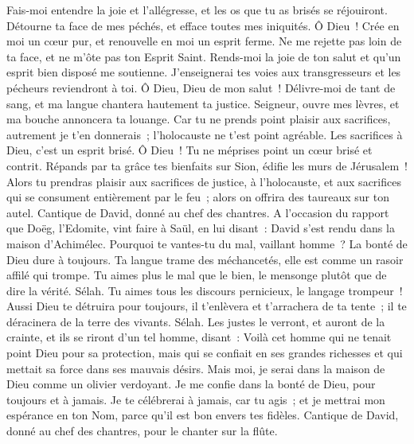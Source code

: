 \begin{multicols}{2}
Fais-moi entendre la joie et l'allégresse, et les os que tu as brisés se réjouiront.
Détourne ta face de mes péchés, et efface toutes mes iniquités.
Ô Dieu~! Crée en moi un cœur pur, et renouvelle en moi un esprit ferme.
Ne me rejette pas loin de ta face, et ne m'ôte pas ton Esprit Saint.
Rends-moi la joie de ton salut et qu'un esprit bien disposé me soutienne.
J'enseignerai tes voies aux transgresseurs et les pécheurs reviendront à toi.
Ô Dieu, Dieu de mon salut~! Délivre-moi de tant de sang, et ma langue chantera hautement ta justice.
Seigneur, ouvre mes lèvres, et ma bouche annoncera ta louange.
Car tu ne prends point plaisir aux sacrifices, autrement je t'en donnerais~; l'holocauste ne t'est point agréable.
Les sacrifices à Dieu, c'est un esprit brisé. Ô Dieu~! Tu ne méprises point un cœur brisé et contrit.
Répands par ta grâce tes bienfaits sur Sion, édifie les murs de Jérusalem~!
Alors tu prendras plaisir aux sacrifices de justice, à l'holocauste, et aux sacrifices qui se consument entièrement par le feu~; alors on offrira des taureaux sur ton autel.
\VerseOne{}Cantique de David, donné au chef des chantres.
A l'occasion du rapport que Doëg, l'Edomite, vint faire à Saül, en lui disant~: David s'est rendu dans la maison d'Achimélec.
Pourquoi te vantes-tu du mal, vaillant homme~? La bonté de Dieu dure à toujours.
Ta langue trame des méchancetés, elle est comme un rasoir affilé qui trompe.
Tu aimes plus le mal que le bien, le mensonge plutôt que de dire la vérité. Sélah.
Tu aimes tous les discours pernicieux, le langage trompeur~!
Aussi Dieu te détruira pour toujours, il t'enlèvera et t'arrachera de ta tente~; il te déracinera de la terre des vivants. Sélah.
Les justes le verront, et auront de la crainte, et ils se riront d'un tel homme, disant~:
Voilà cet homme qui ne tenait point Dieu pour sa protection, mais qui se confiait en ses grandes richesses et qui mettait sa force dans ses mauvais désirs.
Mais moi, je serai dans la maison de Dieu comme un olivier verdoyant. Je me confie dans la bonté de Dieu, pour toujours et à jamais.
Je te célébrerai à jamais, car tu agis~; et je mettrai mon espérance en ton Nom, parce qu'il est bon envers tes fidèles.
\VerseOne{}Cantique de David, donné au chef des chantres, pour le chanter sur la flûte.

\end{multicols}
